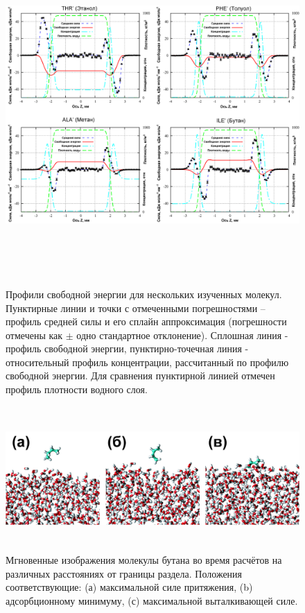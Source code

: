 \begin{figure}
\includegraphics[width=17cm,height=13cm]{4pmf}
\caption{\label{4pmf} Профили свободной энергии для нескольких изученных молекул. Пунктирные линии и точки с отмеченными погрешностями -- профиль средней силы и его сплайн аппроксимация (погрешности отмечены как $\pm$ одно стандартное отклонение). Сплошная линия - профиль свободной энергии, пунктирно-точечная линия - относительный профиль концентрации, рассчитанный по профилю свободной энергии. Для сравнения пунктирной линией отмечен профиль плотности водного слоя.}
\end{figure}

\begin{figure}
\includegraphics[width=17cm,height=5.5cm]{butane_snapshots}
\caption{\label{butane_snapshots} Мгновенные изображения молекулы бутана во время расчётов на различных расстояниях от границы раздела. Положения соответствующие: (а) максимальной силе притяжения, (b) адсорбционному минимуму, (с) максимальной выталкивающей силе.}
\end{figure}

